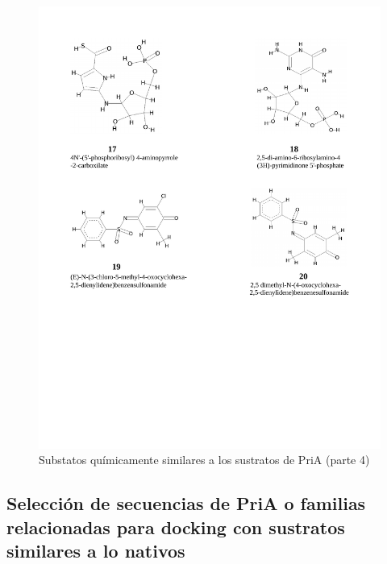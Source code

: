 \documentclass[12pt,twoside]{reedthesis}
\begin{document}
  \begin{figure}[h!tbp]
  \centering
  \includegraphics[angle = 0,scale = .8]{chapter4/esquema_quimico-4-4.pdf}
  \caption[Substatos químicamente similares a los sustratos de PriA (parte 4)]{\footnotesize{Substatos químicamente similares a los sustratos de PriA (parte 4)}}
  \label{fig:Eschema4}
  \end{figure}
  
  \clearpage  
  
  \subsection{Selección de secuencias de PriA o familias relacionadas para
  docking con sustratos similares a lo
  nativos}\label{seleccion-de-secuencias-de-pria-o-familias-relacionadas-para-docking-con-sustratos-similares-a-lo-nativos}
  
\end{document}
